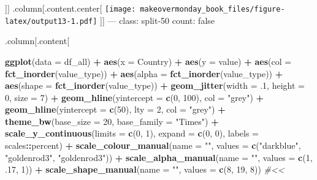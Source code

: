\documentclass[]{book}
\newenvironment{Shaded}{\begin{snugshade}}{\end{snugshade}}
\newcommand{\KeywordTok}[1]{\textcolor[rgb]{0.13,0.29,0.53}{\textbf{#1}}}
\newcommand{\DataTypeTok}[1]{\textcolor[rgb]{0.13,0.29,0.53}{#1}}
\newcommand{\DecValTok}[1]{\textcolor[rgb]{0.00,0.00,0.81}{#1}}
\newcommand{\StringTok}[1]{\textcolor[rgb]{0.31,0.60,0.02}{#1}}
\newcommand{\CommentTok}[1]{\textcolor[rgb]{0.56,0.35,0.01}{\textit{#1}}}
\newcommand{\OperatorTok}[1]{\textcolor[rgb]{0.81,0.36,0.00}{\textbf{#1}}}
\newcommand{\NormalTok}[1]{#1}
\theoremstyle{definition}
\theoremstyle{definition}
\theoremstyle{definition}
\theoremstyle{remark}
\begin{document}
{]}{]} .column{[}.content.center{[}
\texttt{[image: makeovermonday\_book\_files/figure-latex/output13-1.pdf]}
{]}{]} --- class: split-50 count: false

.column{[}.content{[}

\begin{Shaded}
\begin{Highlighting}[]
\KeywordTok{ggplot}\NormalTok{(}\DataTypeTok{data =}\NormalTok{ df_all) }\OperatorTok{+}
\StringTok{  }\KeywordTok{aes}\NormalTok{(}\DataTypeTok{x =}\NormalTok{ Country) }\OperatorTok{+}
\StringTok{  }\KeywordTok{aes}\NormalTok{(}\DataTypeTok{y =}\NormalTok{ value) }\OperatorTok{+}
\StringTok{  }\KeywordTok{aes}\NormalTok{(}\DataTypeTok{col =} \KeywordTok{fct_inorder}\NormalTok{(value_type)) }\OperatorTok{+}
\StringTok{  }\KeywordTok{aes}\NormalTok{(}\DataTypeTok{alpha =} \KeywordTok{fct_inorder}\NormalTok{(value_type)) }\OperatorTok{+}
\StringTok{  }\KeywordTok{aes}\NormalTok{(}\DataTypeTok{shape =} \KeywordTok{fct_inorder}\NormalTok{(value_type)) }\OperatorTok{+}
\StringTok{  }\KeywordTok{geom_jitter}\NormalTok{(}\DataTypeTok{width =}\NormalTok{ .}\DecValTok{1}\NormalTok{, }\DataTypeTok{height =} \DecValTok{0}\NormalTok{, }\DataTypeTok{size =} \DecValTok{7}\NormalTok{) }\OperatorTok{+}
\StringTok{  }\KeywordTok{geom_hline}\NormalTok{(}\DataTypeTok{yintercept =} \KeywordTok{c}\NormalTok{(}\DecValTok{0}\NormalTok{, }\DecValTok{100}\NormalTok{), }\DataTypeTok{col =} \StringTok{"grey"}\NormalTok{) }\OperatorTok{+}
\StringTok{  }\KeywordTok{geom_hline}\NormalTok{(}\DataTypeTok{yintercept =} \KeywordTok{c}\NormalTok{(}\DecValTok{50}\NormalTok{), }\DataTypeTok{lty =} \DecValTok{2}\NormalTok{, }\DataTypeTok{col =} \StringTok{"grey"}\NormalTok{) }\OperatorTok{+}
\StringTok{  }\KeywordTok{theme_bw}\NormalTok{(}\DataTypeTok{base_size =} \DecValTok{20}\NormalTok{, }\DataTypeTok{base_family =} \StringTok{"Times"}\NormalTok{) }\OperatorTok{+}
\StringTok{  }\KeywordTok{scale_y_continuous}\NormalTok{(}\DataTypeTok{limits =} \KeywordTok{c}\NormalTok{(}\DecValTok{0}\NormalTok{, }\DecValTok{1}\NormalTok{), }\DataTypeTok{expand =} \KeywordTok{c}\NormalTok{(}\DecValTok{0}\NormalTok{, }\DecValTok{0}\NormalTok{), }\DataTypeTok{labels =}\NormalTok{ scales}\OperatorTok{::}\NormalTok{percent) }\OperatorTok{+}
\StringTok{  }\KeywordTok{scale_colour_manual}\NormalTok{(}\DataTypeTok{name =} \StringTok{""}\NormalTok{, }\DataTypeTok{values =} \KeywordTok{c}\NormalTok{(}\StringTok{"darkblue"}\NormalTok{, }\StringTok{"goldenrod3"}\NormalTok{, }\StringTok{"goldenrod3"}\NormalTok{)) }\OperatorTok{+}
\StringTok{  }\KeywordTok{scale_alpha_manual}\NormalTok{(}\DataTypeTok{name =} \StringTok{""}\NormalTok{, }\DataTypeTok{values =} \KeywordTok{c}\NormalTok{(}\DecValTok{1}\NormalTok{, .}\DecValTok{17}\NormalTok{, }\DecValTok{1}\NormalTok{)) }\OperatorTok{+}
\StringTok{  }\KeywordTok{scale_shape_manual}\NormalTok{(}\DataTypeTok{name =} \StringTok{""}\NormalTok{, }\DataTypeTok{values =} \KeywordTok{c}\NormalTok{(}\DecValTok{8}\NormalTok{, }\DecValTok{19}\NormalTok{, }\DecValTok{8}\NormalTok{))  }\CommentTok{#<<}
\end{Highlighting}
\end{Shaded}
\end{document}
